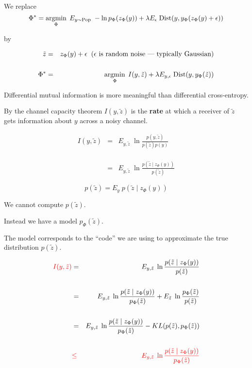 {

We replace
\vfill
$$\Phi^* = \operatorname*{argmin}_\Phi \;E_{y \sim \mathrm{Pop}}\;- \ln p_\Phi(z_\Phi(y)) + \lambda E_\epsilon\; \mathrm{Dist}(y,y_\Phi(z_\Phi(y) + \epsilon))$$

by

\begin{eqnarray*}
\tilde{z} & = & z_\Phi(y) + \epsilon \;\;\mbox{($\epsilon$ is random noise --- typically Gaussian)} \\
\\
\Phi^* & = & \operatorname*{argmin}_\Phi \;I(y,\tilde{z}) + \lambda E_{y,\epsilon}\; \mathrm{Dist}(y,y_\Phi(\tilde{z}))
\end{eqnarray*}

\vfill
Differential mutual information is more meaningful than differential cross-entropy.


By the channel capacity theorem $I(y,\tilde{z})$ is the {\bf rate} at which a receiver of $\tilde{z}$ gets information about $y$ across a noisy channel.

\begin{eqnarray*}
I(y,\tilde{z})  & = & E_{y,\tilde{z}}\; \ln \frac{p(y,\tilde{z})}{p(\tilde{z})p(y)} \\
\\
\\
\\
& = & E_{y,\tilde{z}}\;\ln \frac{p(\tilde{z}\;|\;z_\Phi(y))}{p(\tilde{z})}
\end{eqnarray*}


$$p(\tilde{z}) = E_y\;p(\tilde{z}\;|\;z_\Phi(y))$$

\vfill
We cannot compute $p(\tilde{z})$.

\vfill
Instead we have a model $p_\Phi(\tilde{z})$.

\vfill
The model corresponds to the ``code'' we are using to approximate the true distribution $p(\tilde{z})$.


\begin{eqnarray*}
{\color{red} I(y,\tilde{z})}  & = & E_{y,\tilde{z}}\;\ln \frac{p(\tilde{z}\;|\;z_\Phi(y))}{p(\tilde{z})} \\
\\
& = & E_{y,\tilde{z}}\;\ln \frac{p(\tilde{z}\;|\;z_\Phi(y))}{p_\Phi(\tilde{z})} + E_{\tilde{z}}\;\ln\frac{p_\Phi(\tilde{z})}{p(\tilde{z})} \\
\\
& = & E_{y,\tilde{z}}\;\ln \frac{p(\tilde{z}\;|\;z_\Phi(y))}{p_\Phi(\tilde{z})} - KL(p(\tilde{z}),p_\Phi(\tilde{z})) \\
\\
& {\color{red} \leq} & {\color{red} E_{y,\tilde{z}}\;\ln \frac{p(\tilde{z}\;|\;z_\Phi(y))}{p_\Phi(\tilde{z})}}
\end{eqnarray*}


}
